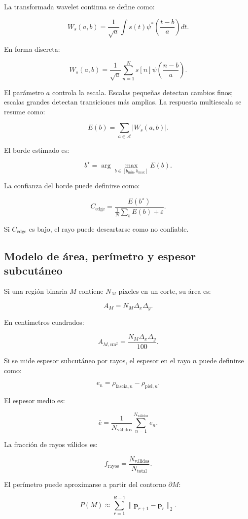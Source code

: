 \documentclass[12pt,a4paper]{article}
\begin{document}
La transformada wavelet continua se define como:

\[
W_s(a,b)
=
\frac{1}{\sqrt{a}}
\int
s(t)
\psi^\ast
\left(
\frac{t-b}{a}
\right)
dt.
\]

En forma discreta:

\[
W_s(a,b)
=
\frac{1}{\sqrt{a}}
\sum_{n=1}^{N}
s[n]
\psi
\left(
\frac{n-b}{a}
\right).
\]

El parámetro \(a\) controla la escala. Escalas pequeñas detectan cambios finos; escalas grandes detectan transiciones más amplias. La respuesta multiescala se resume como:

\[
E(b)
=
\sum_{a\in\mathcal{A}}
|W_s(a,b)|.
\]

El borde estimado es:

\[
b^\star
=
\arg\max_{b\in[b_{\min},b_{\max}]}
E(b).
\]

La confianza del borde puede definirse como:

\[
C_{\text{edge}}
=
\frac{E(b^\star)}
{\frac{1}{N}\sum_{b}E(b)+\varepsilon}.
\]

Si \(C_{\text{edge}}\) es bajo, el rayo puede descartarse como no confiable.

\subsection{Modelo de área, perímetro y espesor subcutáneo}

Si una región binaria \(M\) contiene \(N_M\) píxeles en un corte, su área es:

\[
A_M =
N_M\Delta_x\Delta_y.
\]

En centímetros cuadrados:

\[
A_{M,\text{cm}^2}
=
\frac{N_M\Delta_x\Delta_y}{100}.
\]

Si se mide espesor subcutáneo por rayos, el espesor en el rayo \(n\) puede definirse como:

\[
e_n =
\rho_{\text{fascia},n}
-
\rho_{\text{piel},n}.
\]

El espesor medio es:

\[
\bar{e}
=
\frac{1}{N_{\text{válidos}}}
\sum_{n=1}^{N_{\text{válidos}}}
e_n.
\]

La fracción de rayos válidos es:

\[
f_{\text{rayos}}
=
\frac{N_{\text{válidos}}}{N_{\text{total}}}.
\]

El perímetro puede aproximarse a partir del contorno \(\partial M\):

\[
P(M)
\approx
\sum_{r=1}^{R-1}
\|\mathbf{p}_{r+1}-\mathbf{p}_{r}\|_2.
\]
\end{document}
